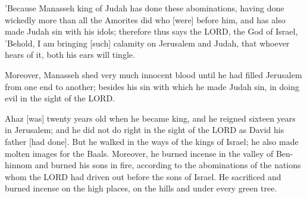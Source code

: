 \vspace{2\baselineskip}

\begin{scripture}[2 Kings 21:11-12]
    'Because Manasseh king of Judah has done these abominations, having done wickedly more than all the Amorites did who [were] before him, and has also made Judah sin with his idols;
    therefore thus says the LORD, the God of Israel, 'Behold, I am bringing [such] calamity on Jerusalem and Judah, that whoever hears of it, both his ears will tingle.
\end{scripture}

\vspace{2\baselineskip}

\begin{scripture}[2 Kings 21:16]
    Moreover, Manasseh shed very much innocent blood until he had filled Jerusalem from one end to another; besides his sin with which he made Judah sin, in doing evil in the sight of the LORD.
\end{scripture}

\vspace{2\baselineskip}

\begin{scripture}[2 Chronicles 28:1-4]
    Ahaz [was] twenty years old when he became king, and he reigned sixteen years in Jerusalem; and he did not do right in the sight of the LORD as David his father [had done].
    But he walked in the ways of the kings of Israel; he also made molten images for the Baals.
    Moreover, he burned incense in the valley of Ben-hinnom and burned his sons in fire, according to the abominations of the nations whom the LORD had driven out before the sons of Israel.
    He sacrificed and burned incense on the high places, on the hills and under every green tree.
\end{scripture}

\vspace{2\baselineskip}
